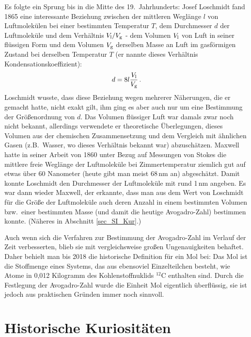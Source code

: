 Es folgte ein Sprung bis in die Mitte des 19.\ Jahrhunderts:
Josef Loschmidt 
fand 1865 eine interessante Beziehung zwischen der mittleren Wegl\"ange $l$ von
Luftmolek\"ulen bei einer bestimmten Temperatur $T$, dem
Durchmesser $d$ der Luftmolek\"ule und dem Verh\"altnis $V_{\rm l}/V_{\rm g}$ - dem Volumen $V_{\rm l}$
von Luft in seiner fl\"ussigen Form und dem Volumen $V_{\rm g}$ derselben Masse an Luft im gasf\"ormigen
Zustand bei derselben Temperatur $T$ (er nannte dieses Verh\"altnis Kondensationskoeffizient):
\begin{equation}
               d = 8 l \frac{V_{\rm l}}{V_{\rm g}} \, .
\end{equation} 
Loschmidt wusste, dass diese Beziehung wegen mehrerer N\"aherungen, die er gemacht hatte, nicht 
exakt gilt, ihm ging es aber auch nur um eine Bestimmung der
Gr\"o\ss enordnung von $d$. Das Volumen fl\"ussiger Luft war damals zwar noch nicht bekannt,
allerdings verwendete er theoretische \"Uberlegungen, dieses Volumen aus der chemischen Zusammensetzung
und dem Vergleich mit \"ahnlichen Gasen (z.B.\ Wasser, wo dieses Verh\"altnis bekannt war) abzusch\"atzen. 
Maxwell hatte in seiner Arbeit von 1860 unter Bezug auf Messungen von Stokes die mittlere freie Wegl\"ange 
der Luftmolek\"ule bei Zimmertemperatur ziemlich gut auf etwas \"uber 60 Nanometer (heute gibt man meist 68\,nm an) 
abgesch\"atzt. Damit konnte Loschmidt den Durchmesser der Luftmolek\"ule mit rund 1\,nm angeben.
Es war dann wieder Maxwell, der erkannte, 
dass man aus dem Wert von Loschmidt f\"ur die Gr\"o\ss e der Luftmolek\"ule auch deren Anzahl in einem 
bestimmten Volumen bzw.\ einer bestimmten Masse (und damit die heutige Avogadro-Zahl) bestimmen konnte. 
(N\"aheres in Abschnitt \ref{sec_SI_Kur}.)

Auch wenn sich die Verfahren zur Bestimmung der Avogadro-Zahl im Verlauf der Zeit
verbesserten, blieb sie mit vergleichsweise gro\ss en Ungenauigkeiten behaftet. Daher
behielt man bis 2018 die historische Definition f\"ur ein Mol bei: Das Mol ist die Stoffmenge eines Systems, das aus
ebensoviel Einzelteilchen besteht, wie Atome in 0,012 Kilogramm des Kohlenstoffnuklids ${}^{12}$C enthalten
sind. Durch die Festlegung der Avogadro-Zahl wurde die Einheit Mol eigentlich \"uberfl\"ussig, sie ist jedoch
aus praktischen Gr\"unden immer noch sinnvoll.

\section{Historische Kuriosit\"aten}

